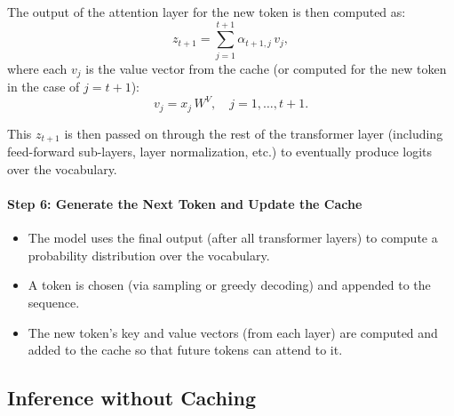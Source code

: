 The output of the attention layer for the new token is then computed as:
\[
z_{t+1} = \sum_{j=1}^{t+1} \alpha_{t+1,j}\, v_j,
\]
where each \( v_j \) is the value vector from the cache (or computed for the new token in the case of \( j=t+1 \)):
\[
v_j = x_j\, W^V, \quad j = 1,\dots,t+1.
\]

This \( z_{t+1} \) is then passed on through the rest of the transformer layer (including feed-forward sub-layers, layer normalization, etc.) to eventually produce logits over the vocabulary.

\paragraph{Step 6: Generate the Next Token and Update the Cache}
\begin{itemize}
	\item The model uses the final output (after all transformer layers) to compute a probability distribution over the vocabulary.
	\item A token is chosen (\eg via sampling or greedy decoding) and appended to the sequence.
	\item The new token's key and value vectors (from each layer) are computed and added to the cache so that future tokens can attend to it.
\end{itemize}

\subsection{Inference without Caching}

